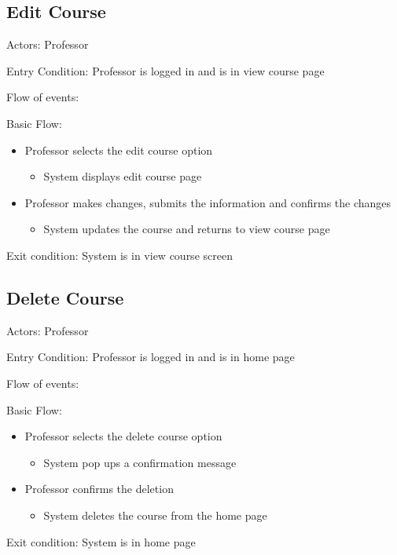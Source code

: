 \subsection*{Edit Course}\label{section:h.vwpc5v6194kl}
Actors: Professor

Entry Condition: Professor is logged in and is in view course 
page

Flow of events:

Basic Flow:

\begin{itemize}
\item Professor selects the edit course option
\begin{itemize}
\item System displays edit course page
\end{itemize}
\item Professor makes changes, submits the information and confirms the 
changes
\begin{itemize}
\item System updates the course and returns to view course page
\end{itemize}
\end{itemize}
Exit condition: System is in view course screen

\subsection*{Delete Course}\label{section:h.u6yi7m9pwom7}
Actors: Professor

Entry Condition: Professor is logged in and is in home page

Flow of events:

Basic Flow:

\begin{itemize}
\item Professor selects the delete course option
\begin{itemize}
\item System pop ups a confirmation message
\end{itemize}
\item Professor confirms the deletion
\begin{itemize}
\item System deletes the course from the home page
\end{itemize}
\end{itemize}

Exit condition: System is in home page



